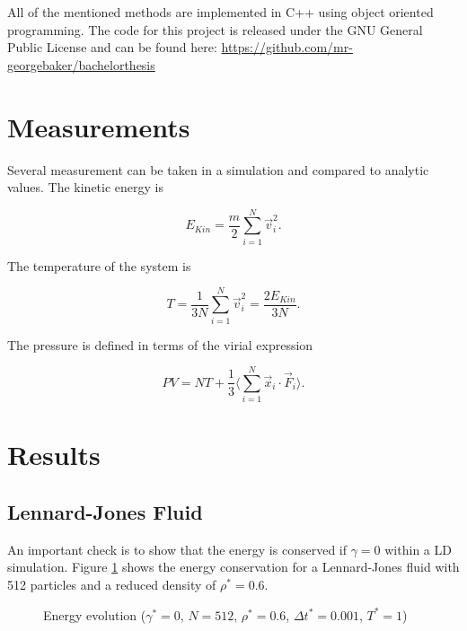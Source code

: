 \documentclass[a4paper]{article}
\begin{document}
All of the mentioned methods are implemented in C++ using object oriented programming. The code for this project is released under the GNU General Public License and can be found here: \href{https://github.com/mr-georgebaker/bachelorthesis}{https://github.com/mr-georgebaker/bachelorthesis}

\newpage

\section{Measurements}

Several measurement can be taken in a simulation and compared to analytic values. The kinetic energy is

\begin{equation}
E_{Kin} = \frac{m}{2} \sum_{i=1}^N \vec{v}_i^2.
\end{equation}

The temperature of the system is

\begin{equation}
T = \frac{1}{3 N} \sum_{i=1}^N \vec{v}_i^2 = \frac{2 E_{Kin}}{3 N}.
\end{equation}

The pressure is defined in terms of the virial expression~\cite{M.Doi1988}

\begin{equation}
P V = N T + \frac{1}{3} \Big \langle \sum_{i=1}^N \vec{x}_i \cdot \vec{F}_i \Big \rangle.
\end{equation}

\section{Results}
\label{sec:result}

\subsection{Lennard-Jones Fluid}

An important check is to show that the energy is conserved if $\gamma = 0$ within a LD simulation. Figure \ref{im:total_energy} shows the energy conservation for a Lennard-Jones fluid with 512 particles and a reduced density of $\rho^* = 0.6$.

\begin{figure} [H]
\centering
\scalebox{1.1}{}
\caption{Energy evolution ($\gamma^* = 0$, $N = 512$, $\rho^* = 0.6$, $\Delta t^* = 0.001 $, $T^* = 1 $)}
\label{im:total_energy}
\end{figure}
\end{document}
